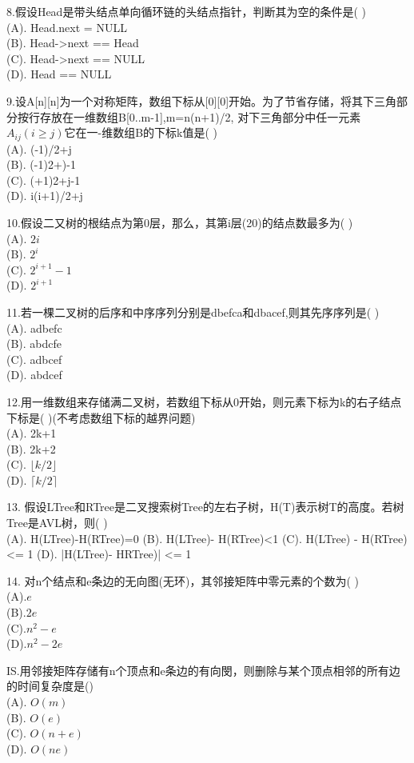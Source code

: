 8.假设Head是带头结点单向循环链的头结点指针，判断其为空的条件是( ) \\
(A). Head.next = NULL \\
(B). Head->next == Head \\
(C). Head->next == NULL \\
(D). Head == NULL

9.设A[n][n]为一个对称矩阵，数组下标从[0][0]开始。为了节省存储，将其下三角部分按行存放在一维数组B[0..m-1],m=n(n+1)/2, 对下三角部分中任一元素$A_{ij}(i\geqslant j)$它在一-维数组B的下标k值是( ) \\
(A). (-1)/2+j \\
(B). (-1)2+)-1 \\
(C). (+1)2+j-1 \\
(D). i(i+1)/2+j

10.假设二又树的根结点为第0层，那么，其第i层(20)的结点数最多为( ) \\
(A). $2i$ \\
(B). $2^i$ \\
(C). $2^{i+1}-1$ \\
(D). $2^{i+1}$

11.若一棵二叉树的后序和中序序列分别是dbefca和dbacef,则其先序序列是( ) \\
(A). adbefc \\
(B). abdcfe \\
(C). adbcef \\
(D). abdcef

12.用一维数组来存储满二叉树，若数组下标从0开始，则元素下标为k的右子结点下标是( )(不考虑数组下标的越界问题) \\
(A). 2k+1 \\
(B). 2k+2 \\
(C). $\lfloor k/2 \rfloor$ \\
(D). $\lceil k/2 \rceil$

13. 假设LTree和RTree是二叉搜索树Tree的左右子树，H(T)表示树T的高度。若树Tree是AVL树，则( ) \\
(A). H(LTree)-H(RTree)=0
(B). H(LTree)- H(RTree)<1
(C). H(LTree) - H(RTree)<= 1
(D). |H(LTree)- HRTree)| <= 1

14. 对n个结点和e条边的无向图(无环)，其邻接矩阵中零元素的个数为( ) \\
(A).$e$ \\
(B).$2e$ \\
(C).$n^2-e$ \\
(D).$n^2-2e$

IS.用邻接矩阵存储有n个顶点和e条边的有向閔，则删除与某个顶点相邻的所有边的时间复杂度是() \\
(A). $O(m)$ \\
(B). $O(e)$ \\
(C). $O(n+e)$ \\
(D). $O(ne)$

